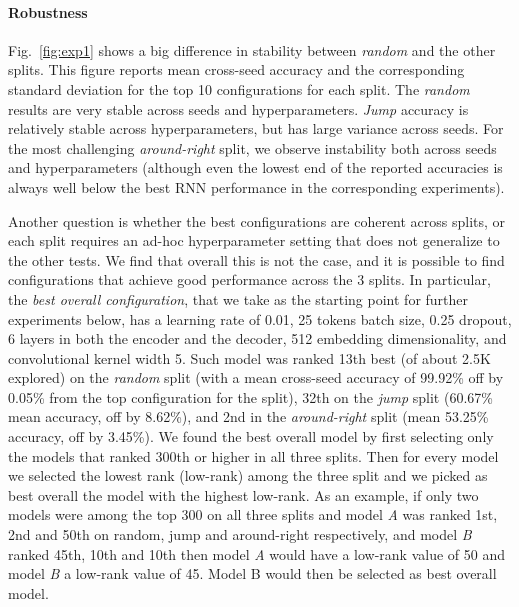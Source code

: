 \paragraph{Robustness} Fig.~\ref{fig:exp1} shows a big difference in
stability between \emph{random} and the other splits. This figure
reports mean cross-seed accuracy and the corresponding standard
deviation for the top 10 configurations for each split. The
\emph{random} results are very stable across seeds and
hyperparameters. \emph{Jump} accuracy is relatively stable across
hyperparameters, but has large variance across seeds. For the most
challenging \emph{around-right} split, we observe instability both
across seeds and hyperparameters (although even the lowest end of the
reported accuracies is always well below the best RNN performance in
the corresponding experiments).

Another question is whether the best configurations are coherent
across splits, or each split requires an ad-hoc hyperparameter setting
that does not generalize to the other tests. We find that overall this
is not the case, and it is possible to find configurations that
achieve good performance across the 3 splits. In particular, the
\emph{best overall configuration}, that we take as the starting point
for further experiments below, has a learning rate of 0.01, 25 tokens
batch size, 0.25 dropout, 6 layers in both the encoder and the
decoder, 512 embedding dimensionality, and convolutional kernel width
5. Such model was ranked 13th best (of about 2.5K explored) on the
\emph{random} split (with a mean cross-seed accuracy of 99.92\% off by
0.05\% from the top configuration for the split), 32th on the
\emph{jump} split (60.67\% mean accuracy, off by 8.62\%), and 2nd in
the \emph{around-right} split (mean 53.25\% accuracy, off by
3.45\%). 
 We found the best overall model by first selecting only the models
that ranked 300th or higher in all three splits. Then for every model
we selected the lowest rank (low-rank) among the three split and we picked 
as best overall the model with the highest low-rank. As an example, if only
two models were among the top 300 on all three splits and model \textit{A} was
ranked 1st, 2nd and 50th on random, jump and around-right respectively, and model \textit{B}
ranked 45th, 10th and 10th then model \textit{A} would have a low-rank value of 50 and
model \textit{B} a low-rank value of 45. Model B would then be selected as best overall model.

 

